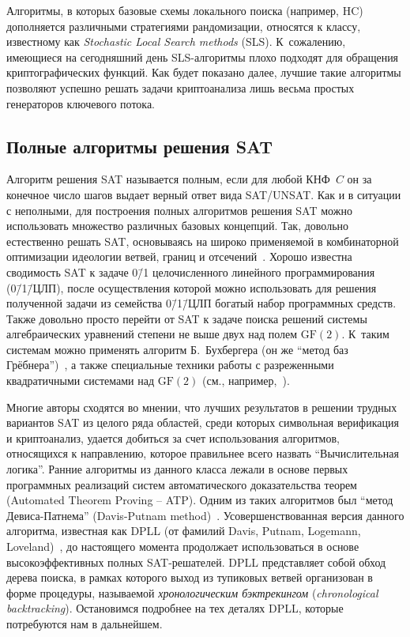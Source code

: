 Алгоритмы, в которых базовые схемы локального поиска (например, HC) дополняется различными стратегиями рандомизации, относятся к классу, известному как \textit{Stochastic Local Search methods} (SLS).
К~сожалению, имеющиеся на сегодняшний день SLS-алгоритмы плохо подходят для обращения криптографических функций.
Как будет показано далее, лучшие такие алгоритмы позволяют успешно решать задачи криптоанализа лишь весьма простых генераторов ключевого потока.

\subsection{Полные алгоритмы решения SAT}

Алгоритм решения SAT называется полным, если для любой КНФ~$C$ он за конечное число шагов выдает верный ответ вида SAT/UNSAT.
Как и в ситуации с неполными, для построения полных алгоритмов решения SAT можно использовать множество различных базовых концепций.
Так, довольно естественно решать SAT, основываясь на широко применяемой в комбинаторной оптимизации идеологии ветвей, границ и отсечений~\cite{papadimitriou1982}.
Хорошо известна сводимость SAT к задаче 0\=/1 целочисленного линейного программирования (0\=/1\=/ЦЛП), после осуществления которой можно использовать для решения полученной задачи из семейства 0\=/1\=/ЦЛП богатый набор программных средств.
Также довольно просто перейти от SAT к задаче поиска решений системы алгебраических уравнений степени не выше двух над полем $\mathrm{GF}(2)$.
К~таким системам можно применять алгоритм Б.~Бухбергера (он же \enquote{метод баз Грёбнера})~\cite{buchberger2006}, а также специальные техники работы с разреженными квадратичными системами над $\mathrm{GF}(2)$ (см., например,~\cite{goos1999,courtois2002}).

Многие авторы сходятся во мнении, что лучших результатов в решении трудных вариантов SAT из целого ряда областей, среди которых символьная верификация и криптоанализ, удается добиться за счет использования алгоритмов, относящихся к направлению, которое правильнее всего назвать \enquote{Вычислительная логика}.
Ранние алгоритмы из данного класса лежали в основе первых программных реализаций систем автоматического доказательства теорем (Automated Theorem Proving \--- ATP).
Одним из таких алгоритмов был \enquote{метод Девиса-Патнема} (Davis-Putnam method)~\cite{davis1960}.
Усовершенствованная версия данного алгоритма, известная как DPLL (от фамилий Davis, Putnam, Logemann, Loveland)~\cite{davis1962}, до настоящего момента продолжает использоваться в основе высокоэффективных полных SAT-решателей.
DPLL представляет собой обход дерева поиска, в рамках которого выход из тупиковых ветвей организован в форме процедуры, называемой \textit{хронологическим бэктрекингом} (\textit{chronological backtracking}).
Остановимся подробнее на тех деталях DPLL, которые потребуются нам в дальнейшем.

